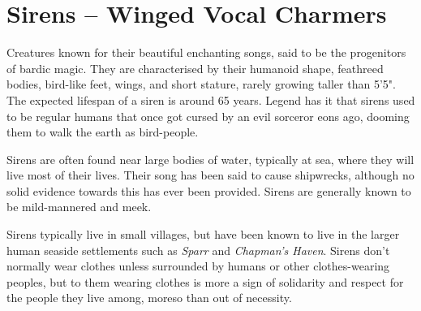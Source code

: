 \section{Sirens -- Winged Vocal Charmers}
Creatures known for their beautiful enchanting songs, said to be the progenitors of bardic magic.
They are characterised by their humanoid shape, feathreed bodies, bird-like feet, wings, and short stature, rarely growing taller than 5'5".
The expected lifespan of a siren is around 65 years.
Legend has it that sirens used to be regular humans that once got cursed by an evil sorceror eons ago, dooming them to walk the earth as bird-people.

Sirens are often found near large bodies of water, typically at sea, where they will live most of their lives.
Their song has been said to cause shipwrecks, although no solid evidence towards this has ever been provided.
Sirens are generally known to be mild-mannered and meek.

Sirens typically live in small villages, but have been known to live in the larger human seaside settlements such as \textit{Sparr} and \textit{Chapman's Haven}.
Sirens don't normally wear clothes unless surrounded by humans or other clothes-wearing peoples, but to them wearing clothes is more a sign of solidarity and respect for the people they live among, moreso than out of necessity.